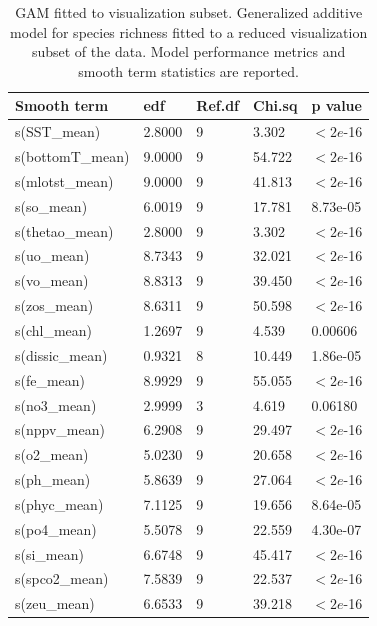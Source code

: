 \documentclass[a4paper,fleqn]{cas-sc}
\begin{document}
\begin{table}[width=.9\linewidth,cols=5,pos=h]
\caption{GAM fitted to visualization subset. Generalized additive model for species richness fitted to a reduced visualization subset of the data. Model performance metrics and smooth term statistics are reported.}
\small
\begin{tabular*}{\tblwidth}{@{} LLLLL @{}}
\toprule
\textbf{Smooth term} & \textbf{edf} & \textbf{Ref.df} & \textbf{Chi.sq} & \textbf{p value} \\
\midrule
s(SST\_mean)      & 2.8000 & 9 &  3.302 & $< 2e$-16 \\
s(bottomT\_mean) & 9.0000 & 9 & 54.722 & $< 2e$-16 \\
s(mlotst\_mean)   & 9.0000 & 9 & 41.813 & $< 2e$-16 \\
s(so\_mean)       & 6.0019 & 9 & 17.781 & 8.73e-05 \\
s(thetao\_mean)   & 2.8000 & 9 &  3.302 & $< 2e$-16 \\
s(uo\_mean)       & 8.7343 & 9 & 32.021 & $< 2e$-16 \\
s(vo\_mean)       & 8.8313 & 9 & 39.450 & $< 2e$-16 \\
s(zos\_mean)      & 8.6311 & 9 & 50.598 & $< 2e$-16 \\
s(chl\_mean)      & 1.2697 & 9 &  4.539 & 0.00606  \\
s(dissic\_mean)   & 0.9321 & 8 & 10.449 & 1.86e-05 \\
s(fe\_mean)       & 8.9929 & 9 & 55.055 & $< 2e$-16 \\
s(no3\_mean)      & 2.9999 & 3 &  4.619 & 0.06180  \\
s(nppv\_mean)     & 6.2908 & 9 & 29.497 & $< 2e$-16 \\
s(o2\_mean)       & 5.0230 & 9 & 20.658 & $< 2e$-16 \\
s(ph\_mean)       & 5.8639 & 9 & 27.064 & $< 2e$-16 \\
s(phyc\_mean)     & 7.1125 & 9 & 19.656 & 8.64e-05 \\
s(po4\_mean)      & 5.5078 & 9 & 22.559 & 4.30e-07 \\
s(si\_mean)       & 6.6748 & 9 & 45.417 & $< 2e$-16 \\
s(spco2\_mean)    & 7.5839 & 9 & 22.537 & $< 2e$-16 \\
s(zeu\_mean)      & 6.6533 & 9 & 39.218 & $< 2e$-16 \\
\bottomrule
\end{tabular*}
\label{tab:10}
\end{table}
\FloatBarrier
\end{document}

